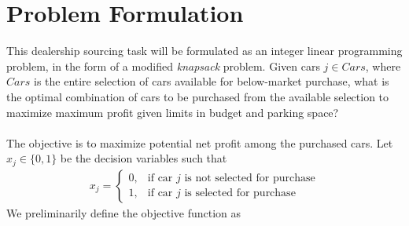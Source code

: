 \documentclass{article}
\begin{document}
\section{Problem Formulation}
This dealership sourcing task will be formulated as an integer linear programming problem, in the form of a modified \textit{knapsack} problem. Given cars $j \in Cars$, where $Cars$ is the entire selection of cars available for below-market purchase, what is the optimal combination of cars to be purchased from the available selection to maximize maximum profit given limits in budget and parking space? 
\\
\\
The objective is to maximize potential net profit among the purchased cars. Let $x_j\in\{0,1\}$ be the decision variables such that
\begin{align*}
x_j =
\begin{cases} 
    0, & \text{if car $j$ is not selected for purchase} \\
    1, & \text{if car $j$ is selected for purchase}
\end{cases}
\end{align*}
We preliminarily define the objective function as
\end{document}
